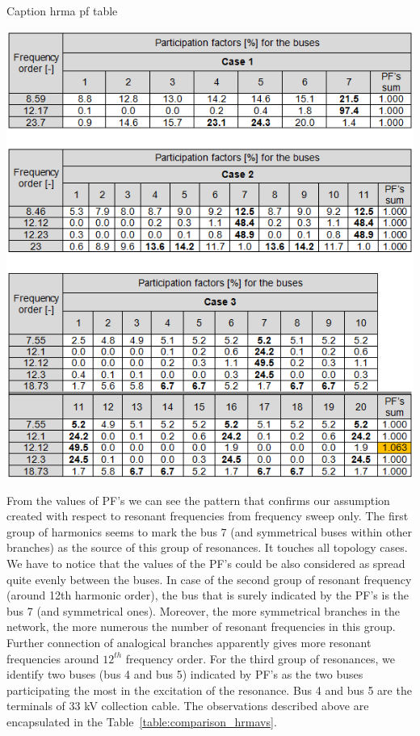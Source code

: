 \documentclass[12pt]{report} %
\begin{document}
\begin{table}[htb]
	\centering
	\caption{Caption hrma pf table}
	\includegraphics[width=1\textwidth]{img/Case123/PF_VS_table.png}
  	\label{table:comparison_pfvs}
\end{table}
\FloatBarrier

From the values of PF’s we can see the pattern that confirms our assumption created with respect to resonant frequencies from frequency sweep only.
The first group of harmonics seems to mark the bus 7 (and symmetrical buses within other branches) as the source of this group of resonances. It touches all topology cases. We have to notice that the values of the PF’s could be also considered as spread quite evenly between the buses.
In case of the second group of resonant frequency (around 12th harmonic order), the bus that is surely indicated by the PF’s is the bus 7 (and symmetrical ones). Moreover, the more symmetrical branches in the network, the more numerous the number of resonant frequencies in this group. Further connection of analogical branches apparently gives more resonant frequencies around $12^{th}$ frequency order.
For the third group of resonances, we identify two buses (bus 4 and bus 5) indicated by PF’s as the two buses participating the most in the excitation of the resonance. Bus 4 and bus 5 are the terminals of 33 kV collection cable. The observations described above are encapsulated in the Table~\ref{table:comparison_hrmavs}.
\end{document}
